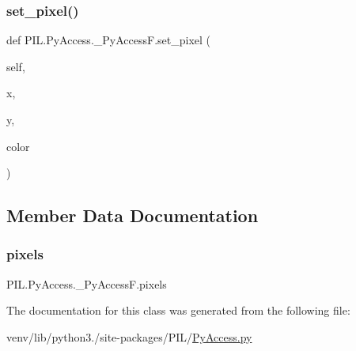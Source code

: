 \subsubsection{\texorpdfstring{set\+\_\+pixel()}{set\_pixel()}}
{\footnotesize\ttfamily def P\+I\+L.\+Py\+Access.\+\_\+\+Py\+Access\+F.\+set\+\_\+pixel (\begin{DoxyParamCaption}\item[{}]{self,  }\item[{}]{x,  }\item[{}]{y,  }\item[{}]{color }\end{DoxyParamCaption})}



\subsection{Member Data Documentation}
\mbox{\label{classPIL_1_1PyAccess_1_1__PyAccessF_ae9afe72a11c370c991c46a4f6797e7ce}} 
\subsubsection{\texorpdfstring{pixels}{pixels}}
{\footnotesize\ttfamily P\+I\+L.\+Py\+Access.\+\_\+\+Py\+Access\+F.\+pixels}



The documentation for this class was generated from the following file\+:\begin{DoxyCompactItemize}
\item 
venv/lib/python3./site-\/packages/\+P\+I\+L/\hyperlink{PyAccess_8py}{Py\+Access.\+py}\end{DoxyCompactItemize}
